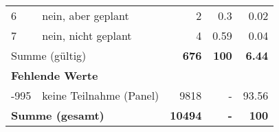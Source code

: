 \begin{longtable}{lXrrr}
     6 &
     \multicolumn{1}{X}{ nein, aber geplant   } &


       \num{2} &
       \num[round-mode=places,round-precision=2]{0.3} &
         \num[round-mode=places,round-precision=2]{0.02} \\

     7 &
     \multicolumn{1}{X}{ nein, nicht geplant   } &


       \num{4} &
       \num[round-mode=places,round-precision=2]{0.59} &
         \num[round-mode=places,round-precision=2]{0.04} \\
     \midrule
     \multicolumn{2}{l}{Summe (gültig)} &
       \textbf{\num{676}} &
     \textbf{\num{100}} &
       \textbf{\num[round-mode=places,round-precision=2]{6.44}} \\
     \multicolumn{5}{l}{\textbf{Fehlende Werte}}\\
       -995 &
       keine Teilnahme (Panel) &
         \num{9818} &
        - &
         \num[round-mode=places,round-precision=2]{93.56} \\
     \midrule
     \multicolumn{2}{l}{\textbf{Summe (gesamt)}} &
          \textbf{\num{10494}} &
        \textbf{-} &
        \textbf{\num{100}} \\
     \bottomrule
     \end{longtable}
     
